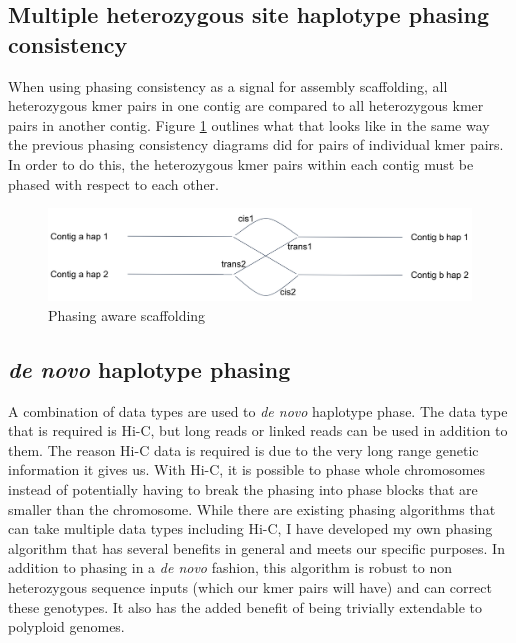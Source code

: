 \subsection{Multiple heterozygous site haplotype phasing consistency}

\par{
When using phasing consistency as a signal for assembly scaffolding, all heterozygous kmer pairs in one contig are compared to all heterozygous kmer pairs in another contig. Figure \ref{figure:scaff} outlines what that looks like in the same way the previous phasing consistency diagrams did for pairs of individual kmer pairs. In order to do this, the heterozygous kmer pairs within each contig must be phased with respect to each other.
}

\begin{figure}[htbp!]
\caption{Phasing aware scaffolding}
\label{figure:scaff}
\begin{centering}
\includegraphics[width=\textwidth]{phasescaff.png}
\end{centering}
\end{figure}



\subsection{\textit{de novo} haplotype phasing}

\par{
A combination of data types are used to \textit{de novo} haplotype phase. The data type that is required is Hi-C, but long reads or linked reads can be used in addition to them. The reason Hi-C data is required is due to the very long range genetic information it gives us. With Hi-C, it is possible to phase whole chromosomes instead of potentially having to break the phasing into phase blocks that are smaller than the chromosome. While there are existing phasing algorithms that can take multiple data types including Hi-C\cite{hapcut2}\cite{HICphasing}, I have developed my own phasing algorithm that has several benefits in general and meets our specific purposes. In addition to phasing in a \textit{de novo} fashion, this algorithm is robust to non heterozygous sequence inputs (which our kmer pairs will have) and can correct these genotypes. It also has the added benefit of being trivially extendable to polyploid genomes.
}

